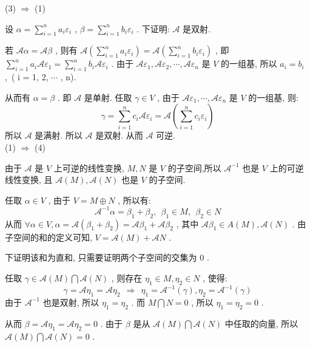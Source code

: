 \documentclass[11pt,a4paper,openany,oneside]{book}
\begin{document}
(3)  $ \Longrightarrow $  (1) 

设 $ \alpha = \sum\limits_{i=1}^n a_i\varepsilon_i $ ,  $ \beta=\sum\limits_{i=1}^n b_i\varepsilon_i $ . 下证明: $ \mathcal{A} $ 是双射.

若 $ \mathcal{A}\alpha = \mathcal{A}\beta $ , 则有 $ \mathcal{A}(\sum\limits_{i=1}^n a_i\varepsilon_i) = \mathcal{A}(\sum\limits_{i=1}^n b_i\varepsilon_i) $ , 即 $ \sum\limits_{i=1}^n a_i\mathcal{A}\varepsilon_1 = \sum\limits_{i=1}^n b_i\mathcal{A}\varepsilon_i $ .
由于 $ \mathcal{A}\varepsilon_1, \mathcal{A}\varepsilon_2, \cdots, \mathcal{A}\varepsilon_n $ 是 $ V $ 的一组基, 所以 $ a_i = b_i $ ,\ ( i = 1, 2,  $ \cdots $ , n).

从而有 $ \alpha = \beta $ . 即 $ \mathcal{A} $ 是单射. 任取 $ \gamma \in V $ , 由于 $ \mathcal{A}\varepsilon_1, \cdots, \mathcal{A}\varepsilon_n $ 是 $ V $ 的一组基, 则:
 $$  \gamma = \sum\limits_{i=1}^n c_i\mathcal{A}\varepsilon_i = \mathcal{A}(\sum\limits_{i=1}^n c_i\varepsilon_i) $$ 
所以 $ \mathcal{A} $ 是满射. 所以 $ \mathcal{A} $ 是双射. 从而 $ \mathcal{A} $ 可逆. \\ 

(1)  $ \Longrightarrow $  (4) 

由于 $ \mathcal{A} $ 是 $ V $ 上可逆的线性变换,  $ M, N $ 是 $ V $ 的子空间,所以 $ \mathcal{A}^{-1} $ 也是 $ V $ 上的可逆线性变换, 且 $ \mathcal{A}(M), \mathcal{A}(N) $ 也是 $ V $ 的子空间.

任取 $ \alpha \in V $ , 由于 $ V = M \oplus  N $ , 所以有:
 $$  \mathcal{A}^{-1}\alpha = \beta_1 + \beta_2,  \ \ \beta_1 \in M, \ \ \beta_2 \in N  $$ 
从而 $ \forall \alpha \in V, \alpha =\mathcal{A}(\beta_1 + \beta_2) = \mathcal{A}\beta_1 + \mathcal{A}\beta_2  $ , 其中 $ \mathcal{A}\beta_1 \in A(M), \mathcal{A}(N) $ .
由子空间的和的定义可知,  $ V = \mathcal{A}(M) + \mathcal{A}N $ . 

下证明该和为直和, 只需要证明两个子空间的交集为 $ 0 $ . 

任取 $ \gamma \in \mathcal{A}(M) \bigcap \mathcal{A}(N) $ , 则存在 $ \eta_1 \in M, \eta_2 \in N $ , 使得:
 $$  \gamma = \mathcal{A}\eta_1 = \mathcal{A}\eta_2  \ \ \Longrightarrow \ \ \eta_1=\mathcal{A}^{-1}(\gamma), \eta_2=\mathcal{A}^{-1}(\gamma) $$ 
由于 $ \mathcal{A}^{-1} $ 也是双射, 所以 $ \eta_1 = \eta_2 $ . 而 $ M \bigcap N = 0 $ , 所以 $ \eta_1 = \eta_2 = 0 $ .

从而 $ \beta = \mathcal{A}\eta_1 = \mathcal{A}\eta_2 =0 $ . 由于 $ \beta $ 是从 $ \mathcal{A}(M) \bigcap \mathcal{A}(N) $ 中任取的向量, 所以 $ \mathcal{A}(M) \bigcap \mathcal{A}(N)=0 $ .
\end{document}
